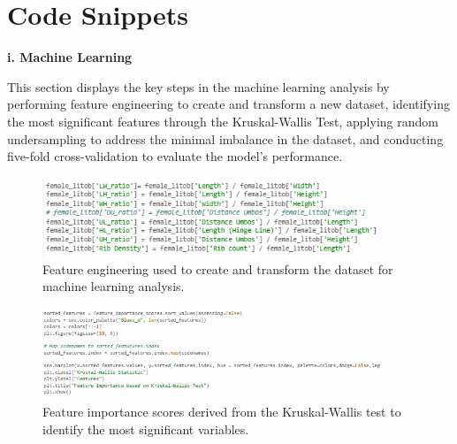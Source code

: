 %
%
%                 

\chapter{Code Snippets}
\label{sec:appendixa}



%

\noindent\textbf{i. Machine Learning}
\vspace{-0.5cm}

This section displays the key steps in the machine learning analysis by performing feature engineering to create and transform a new dataset, identifying the most significant features through the Kruskal-Wallis Test, applying random undersampling to address the minimal imbalance in the dataset, and conducting five-fold cross-validation to evaluate the model's performance.


\begin{figure}[!htbp]
	\centering
	\includegraphics[width=0.9\textwidth, angle=0]{figures/feature_engineering.png}
	\caption{Feature engineering used to create and transform the dataset for machine learning analysis.}
\end{figure}

\begin{figure}[!htbp]
	\centering
	\includegraphics[width=0.9\textwidth, angle=0]{figures/feature_importance.png}
	\caption{Feature importance scores derived from the Kruskal-Wallis test to identify the most significant variables.}
\end{figure}

